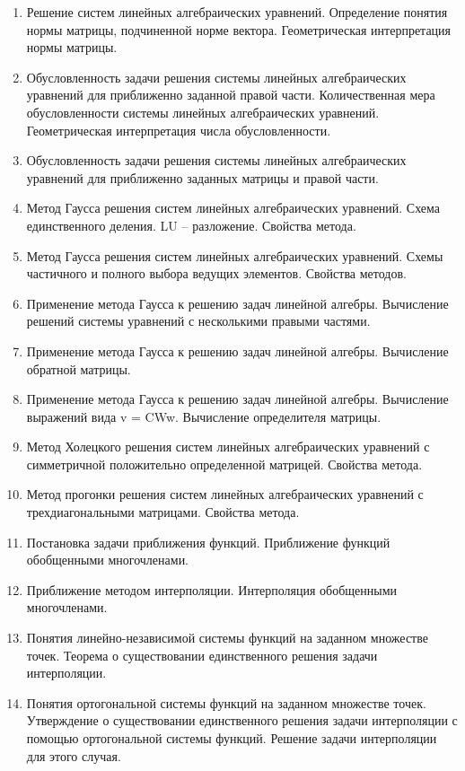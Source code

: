 \documentclass[14pt]{extarticle}
\begin{document}
\begin{enumerate}
    \item Решение систем линейных алгебраических уравнений. Определение понятия нормы матрицы, подчиненной норме вектора. Геометрическая интерпретация нормы матрицы. 
    \item Обусловленность задачи решения системы линейных алгебраических уравнений для приближенно заданной правой части. Количественная мера обусловленности системы линейных алгебраических уравнений. Геометрическая интерпретация числа обусловленности. 
    \item Обусловленность задачи решения системы линейных алгебраических уравнений для приближенно заданных матрицы и правой части. 
    \item Метод Гаусса решения систем линейных алгебраических уравнений. Схема единственного деления. LU – разложение. Свойства метода. 
    \item Метод Гаусса решения систем линейных алгебраических уравнений. Схемы частичного и полного выбора ведущих элементов. Свойства методов. 
    \item Применение метода Гаусса к решению задач линейной алгебры. Вычисление решений системы уравнений с несколькими правыми частями. 
    \item Применение метода Гаусса к решению задач линейной алгебры. Вычисление обратной матрицы. 
    \item Применение метода Гаусса к решению задач линейной алгебры. Вычисление выражений вида v = CWw. Вычисление определителя матрицы. 
    \item Метод Холецкого решения систем линейных алгебраических уравнений с симметричной положительно определенной матрицей. Свойства метода. 
    \item Метод прогонки решения систем линейных алгебраических уравнений с трехдиагональными матрицами. Свойства метода. 
    \item Постановка задачи приближения функций. Приближение функций обобщенными многочленами. 
    \item Приближение методом интерполяции. Интерполяция обобщенными многочленами. 
    \item Понятия линейно-независимой системы функций на заданном множестве точек. Теорема о существовании единственного решения задачи интерполяции. 
    \item Понятия ортогональной системы функций на заданном множестве точек. Утверждение о существовании единственного решения задачи интерполяции с помощью ортогональной системы функций. Решение задачи интерполяции для этого случая. 

\end{enumerate}
\end{document}
